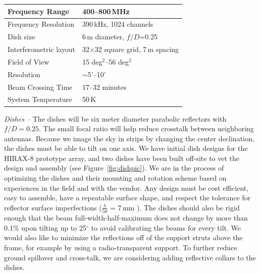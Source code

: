 \documentclass[]{spie}  %
\begin{document}
\begin{minipage}{0.5\textwidth}
  \centering
    \begin{tabular}{|l|l|} 
   \hline
   \rule[-1ex]{0pt}{3.5ex}  Frequency Range & 400--800\,MHz  \\ \hline
   \rule[-1ex]{0pt}{3.5ex}  Frequency Resolution & 390\,kHz, 1024 channels \\ \hline
   \rule[-1ex]{0pt}{3.5ex}  Dish size & 6\,m diameter, $f/D$=0.25 \\ \hline
   \rule[-1ex]{0pt}{3.5ex}  Interferometric layout & 32$\times$32 square grid, 7\,m spacing  \\ \hline
   \rule[-1ex]{0pt}{3.5ex}  Field of View & 15 deg$^{2}$--56 deg$^{2}$ \\ \hline
   \rule[-1ex]{0pt}{3.5ex}  Resolution & $\sim$5'--10'  \\ \hline 
   \rule[-1ex]{0pt}{3.5ex}  Beam Crossing Time & 17--32 minutes   \\ \hline  
   \rule[-1ex]{0pt}{3.5ex}  System Temperature & 50\,K \\ \hline
   \end{tabular}
   \vspace{0.2in}
       \label{tab:salient}
          \vspace{0.1in}
     \vspace{0.2in}
      \label{fig:instrument}
\end{minipage}



\textit{Dishes --} The dishes will be six meter diameter parabolic reflectors with $f/D = 0.25$. The small focal ratio will help reduce crosstalk between neighboring antennas.  Because we image the sky in strips by changing the center declination, the dishes must be able to tilt on one axis. We have initial dish designs for the HIRAX-8 prototype array, and two dishes have been built off-site to vet the design and assembly (see Figure~\ref{fig:dishpic}). We are in the process of optimizing the dishes and their mounting and rotation scheme based on experiences in the field and with the vendor. Any design must be cost efficient, easy to assemble, have a repeatable surface shape, and respect the tolerance for reflector surface imperfections ($\frac{\lambda}{50}$ = 7\,mm \cite{Ruze1952}). The dishes should also be rigid enough that the beam full-width-half-maximum does not change by more than 0.1\% \cite{2015PhRvD..91h3514S} upon tilting up to 25$^{\circ}$ to avoid calibrating the beams for every tilt. We would also like to minimize the reflections off of the support struts above the frame, for example by using a radio-transparent support. To further reduce ground spillover and cross-talk, we are considering adding reflective collars to the dishes. \newline
\end{document}

